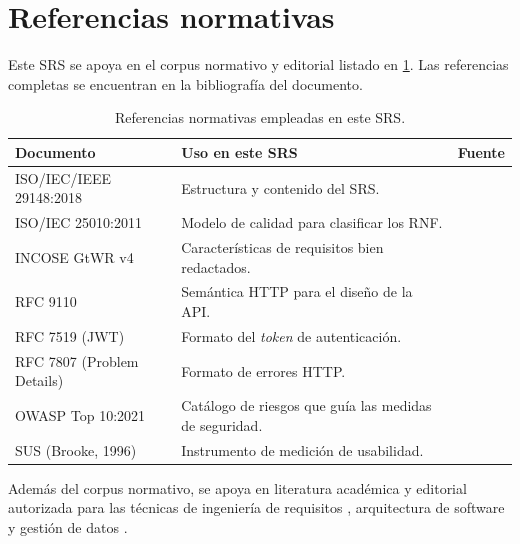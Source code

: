 \documentclass[11pt,a4paper,twoside]{report}
\begin{document}
\section{Referencias normativas}
\label{sec:referencias}

Este SRS se apoya en el corpus normativo y editorial listado en \cref{tab:normativas}. Las referencias completas se encuentran en la bibliograf\'ia del documento.

\begin{table}[htbp]
    \centering
    \small
    \caption{Referencias normativas empleadas en este SRS.}
    \label{tab:normativas}
    \begin{tabularx}{\textwidth}{@{}lXl@{}}
        \toprule
        \textbf{Documento} & \textbf{Uso en este SRS} & \textbf{Fuente} \\
        \midrule
        ISO/IEC/IEEE 29148:2018        & Estructura y contenido del SRS. & \cite{iso29148} \\
        ISO/IEC 25010:2011             & Modelo de calidad para clasificar los RNF. & \cite{iso25010} \\
        INCOSE GtWR v4                 & Caracter\'isticas de requisitos bien redactados. & \cite{incose2023requirements} \\
        RFC 9110                       & Sem\'antica HTTP para el dise\~no de la API. & \cite{rfc9110} \\
        RFC 7519 (JWT)                 & Formato del \emph{token} de autenticaci\'on. & \cite{jones2015jwt} \\
        RFC 7807 (Problem Details)     & Formato de errores HTTP. & \cite{rfc7807} \\
        OWASP Top 10:2021              & Cat\'alogo de riesgos que gu\'ia las medidas de seguridad. & \cite{owasp2021top10} \\
        SUS (Brooke, 1996)             & Instrumento de medici\'on de usabilidad. & \cite{brooke1996sus} \\
        \bottomrule
    \end{tabularx}
\end{table}

Adem\'as del corpus normativo, se apoya en literatura acad\'emica y editorial autorizada para las t\'ecnicas de ingenier\'ia de requisitos \cite{cockburn2001writing,cohn2004user,pohl2010requirements,wiegers2013software}, arquitectura de software \cite{martin2017clean,bass2021software,richards2020fundamentals,brown2023c4} y gesti\'on de datos \cite{kleppmann2017designing}.
\end{document}
